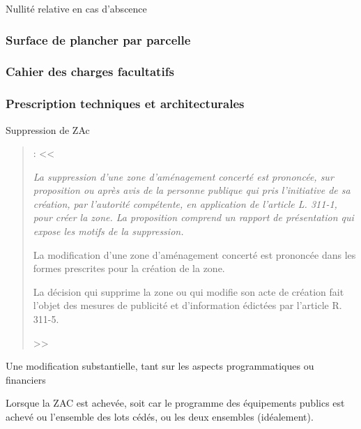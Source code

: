 		Nullité relative en cas d'abscence

		\subsubsection{Surface de plancher par parcelle}

		\subsubsection{Cahier des charges facultatifs}

		\subsubsection{Prescription techniques et architecturales}

Suppression de ZAc

\begin{quote}
	\textbf{} :
	<<
	{\itshape La suppression d'une zone d'aménagement concerté est prononcée, sur proposition ou après avis de la personne publique qui pris l'initiative de sa création, par l'autorité compétente, en application de l'article L. 311-1, pour créer la zone. La proposition comprend un rapport de présentation qui expose les motifs de la suppression.

	\medskip La modification d'une zone d'aménagement concerté est prononcée dans les formes prescrites pour la création de la zone.

	\medskip La décision qui supprime la zone ou qui modifie son acte de création fait l'objet des mesures de publicité et d'information édictées par l'article R. 311-5.} >>
\end{quote}

Une modification substantielle, tant sur les aspects programmatiques ou financiers \lips

Lorsque la ZAC est achevée, soit car le programme des équipements publics est achevé ou l'ensemble des lots cédés, ou les deux ensembles (idéalement).
